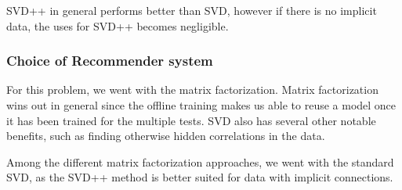 SVD++ in general performs better than SVD, however if there is no implicit data, the uses for SVD++ becomes negligible.

\subsubsection{Choice of Recommender system}\label{sec:decision} %
For this problem, we went with the matrix factorization. Matrix factorization wins out in general since the offline training makes us able to reuse a model once it has been trained for the multiple tests. SVD also has several other notable benefits, such as finding otherwise hidden correlations in the data.

Among the different matrix factorization approaches, we went with the standard SVD, as the SVD++ method is better suited for data with implicit connections.